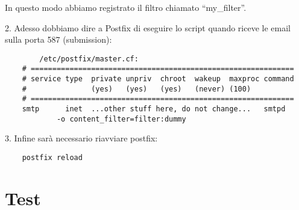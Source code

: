     In questo modo abbiamo registrato il filtro chiamato ``my\_filter''.

    2. Adesso dobbiamo dire a Postfix di eseguire lo script quando riceve le email sulla porta 587 (submission):

    \begin{verbatim}
        /etc/postfix/master.cf:
    # =============================================================
    # service type  private unpriv  chroot  wakeup  maxproc command
    #               (yes)   (yes)   (yes)   (never) (100)
    # =============================================================
    smtp      inet  ...other stuff here, do not change...   smtpd
            -o content_filter=filter:dummy  
    \end{verbatim}

    3. Infine sarà necessario riavviare postfix:

    \begin{verbatim}
    postfix reload 
    \end{verbatim}
    

    \section{Test}